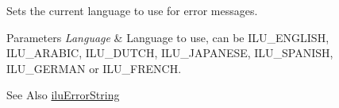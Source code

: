 Sets the current language to use for error messages. 


\begin{DoxyParams}{Parameters}
{\em Language} & Language to use, can be I\-L\-U\-\_\-\-E\-N\-G\-L\-I\-S\-H, I\-L\-U\-\_\-\-A\-R\-A\-B\-I\-C, I\-L\-U\-\_\-\-D\-U\-T\-C\-H, I\-L\-U\-\_\-\-J\-A\-P\-A\-N\-E\-S\-E, I\-L\-U\-\_\-\-S\-P\-A\-N\-I\-S\-H, I\-L\-U\-\_\-\-G\-E\-R\-M\-A\-N or I\-L\-U\-\_\-\-F\-R\-E\-N\-C\-H. \\
\hline
\end{DoxyParams}
\begin{DoxySeeAlso}{See Also}
\hyperlink{group__ilu__util_gaa899a04791dfb88d8b48c823998af427}{ilu\-Error\-String} 
\end{DoxySeeAlso}
